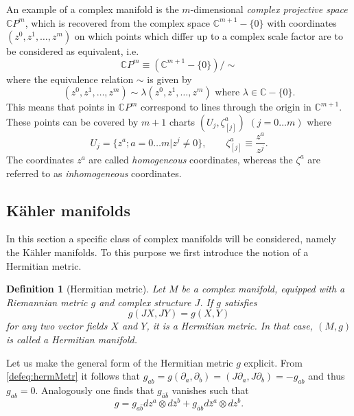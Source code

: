 \documentclass[12pt,twoside]{book}
\newtheorem{definition}{Definition}[chapter]
\begin{document}
An example of a complex manifold is the $m$-dimensional \emph{complex projective space} $\mathbb{C}P^{m}$, which is recovered from the complex space $\mathbb{C}^{m+1}-\{0\}$ with coordinates $(z^{0},z^{1},\ldots,z^{m})$ on which points which differ up to a complex scale factor are to be considered as equivalent, i.e.\
\begin{equation}
\mathbb{C}P^{m}\equiv (\mathbb{C}^{m+1}-\{0\})/\sim
\end{equation}where the equivalence relation $\sim$ is given by
\begin{equation}
(z^{0},z^{1},\ldots,z^{m})\sim\lambda(z^{0},z^{1},\ldots,z^{m})\text{ where } \lambda\in\mathbb{C} - \{0\}.
\end{equation}
This means that points in $\mathbb{C}P^{m}$ correspond to lines through the origin in $\mathbb{C}^{m+1}$. These points can be covered by $m+1$ charts $(U_{j},\zeta^{a}_{[j]})$ $(j=0\ldots m)$ where
\begin{equation}
U_{j}=\{z^{a};a=0\ldots m|z^{j}\neq 0\},\qquad \zeta^{a}_{[j]}\equiv \frac{z^{a}}{z^{j}}.
\end{equation}
The coordinates $z^{a}$ are called \emph{homogeneous} coordinates, whereas the $\zeta^{a}$ are referred to as \emph{inhomogeneous} coordinates.

\subsection{K\"ahler manifolds}

In this section a specific class of complex manifolds will be considered, namely the K\"ahler manifolds. To this purpose we first introduce the notion of a Hermitian metric.

\begin{definition}[Hermitian metric]
Let $M$ be a complex manifold, equipped with a Riemannian metric $g$ and complex structure $J$. If $g$ satisfies
\begin{equation}\label{defeq:hermMetr}
g(JX,JY)=g(X,Y)
\end{equation}
for any two vector fields $X$ and $Y$, it is a Hermitian metric. In that case, $(M,g)$ is called a Hermitian manifold.
\end{definition}
\noindent
Let us make the general form of the Hermitian metric $g$ explicit. From \eqref{defeq:hermMetr} it follows that $g_{ab} = g(\partial_{a}, \partial_{b}) = (J \partial_{a}, J \partial_{b}) = - g_{ab}$ and thus $g_{ab} = 0$. Analogously one finds that $g_{\bar{a} \bar{b}}$ vanishes such that
\begin{equation}
g = g_{a \bar{b}} dz^{a} \otimes d\bar{z}^{b} + g_{\bar{a} b} d\bar{z}^{a} \otimes dz^{b}.
\end{equation}
\end{document}
